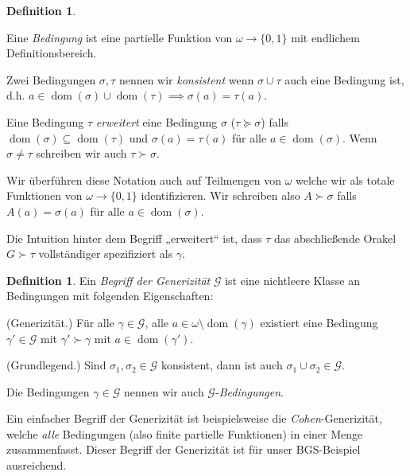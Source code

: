 \documentclass[nofonts]{uebung}
\theoremstyle{definition}
\newtheorem{definition}[theorem]{Definition}
\DeclareMathOperator{\dom}{dom}
\begin{document}
\begin{definition}\begin{thmenum}
    \item Eine \emph{Bedingung} ist eine partielle Funktion von $\omega \to \{0,1\}$ mit endlichem Definitionsbereich.
        \item Zwei Bedingungen $\sigma,\tau$ nennen wir \emph{konsistent} wenn $\sigma\cup\tau$ auch eine Bedingung ist, d.h. $a\in\dom(\sigma)\cup\dom(\tau)\implies \sigma(a)=\tau(a)$.
    \item Eine Bedingung $\tau$ \emph{erweitert} eine Bedingung $\sigma$ ($\tau\succeq \sigma$) falls $\dom(\sigma)\subseteq\dom(\tau)$ und $\sigma(a)=\tau(a)$ für alle $a\in\dom(\sigma)$.
    Wenn $\sigma\neq\tau$ schreiben wir auch $\tau\succ\sigma$.
    \item Wir überführen diese Notation auch auf Teilmengen von $\omega$ welche wir als totale Funktionen von $\omega\to\{0,1\}$ identifizieren.
    Wir schreiben also $A\succ \sigma$ falls $A(a)=\sigma(a)$ für alle $a\in\dom(\sigma)$.
\end{thmenum}
\end{definition}
Die Intuition hinter dem Begriff „erweitert“ ist, dass $\tau$ das abschließende Orakel $G\succ\tau$ vollständiger spezifiziert als $\gamma$.

\begin{definition}\label{def:generizität}
    Ein \emph{Begriff der Generizität} $\mathcal G$ ist eine nichtleere Klasse an Bedingungen mit folgenden Eigenschaften:
    \begin{thmenum}
        \item\label{def:generizität-ext} (Generizität.) Für alle $\gamma\in\mathcal G$, alle $a\in \omega\setminus\dom(\gamma)$ existiert eine Bedingung $\gamma'\in\mathcal G$ mit $\gamma'\succ \gamma$ mit $a\in\dom(\gamma')$.
        \item\label{def:generizität-grundlegend} (Grundlegend.) Sind $\sigma_1, \sigma_2\in\mathcal G$ konsistent, dann ist auch $\sigma_1\cup\sigma_2\in\mathcal G$.
    \end{thmenum}
    Die Bedingungen $\gamma\in \mathcal G$ nennen wir auch $\mathcal G$-\emph{Bedingungen}.
\end{definition}

Ein einfacher Begriff der Generizität ist beispielsweise die \emph{Cohen}-Generizität, welche \emph{alle} Bedingungen (also finite partielle Funktionen) in einer Menge zusammenfasst.
Dieser Begriff der Generizität ist für unser BGS-Beispiel ausreichend.
\end{document}
